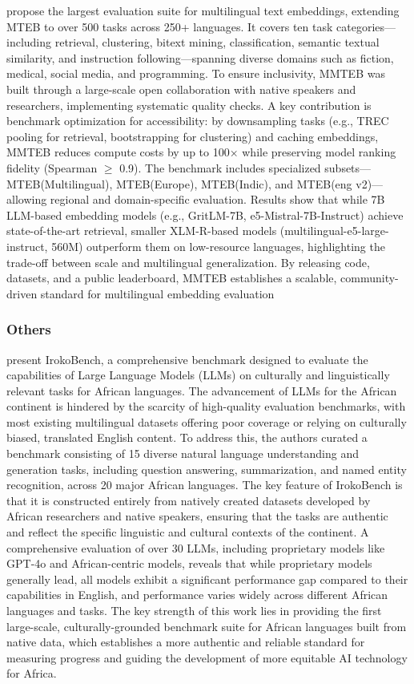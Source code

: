 \documentclass[acmsmall]{acmart}
\begin{document}
 \citep{enevoldsen2025mmtebmassivemultilingualtext} propose the largest evaluation suite for multilingual text embeddings, extending MTEB to over 500 tasks across 250+ languages. It covers ten task categories—including retrieval, clustering, bitext mining, classification, semantic textual similarity, and instruction following—spanning diverse domains such as fiction, medical, social media, and programming. To ensure inclusivity, MMTEB was built through a large-scale open collaboration with native speakers and researchers, implementing systematic quality checks. A key contribution is benchmark optimization for accessibility: by downsampling tasks (e.g., TREC pooling for retrieval, bootstrapping for clustering) and caching embeddings, MMTEB reduces compute costs by up to 100× while preserving model ranking fidelity (Spearman $\geq$ 0.9). The benchmark includes specialized subsets—MTEB(Multilingual), MTEB(Europe), MTEB(Indic), and MTEB(eng v2)—allowing regional and domain-specific evaluation. Results show that while 7B LLM-based embedding models (e.g., GritLM-7B, e5-Mistral-7B-Instruct) achieve state-of-the-art retrieval, smaller XLM-R-based models (multilingual-e5-large-instruct, 560M) outperform them on low-resource languages, highlighting the trade-off between scale and multilingual generalization. By releasing code, datasets, and a public leaderboard, MMTEB establishes a scalable, community-driven standard for multilingual embedding evaluation

\subsubsection{Others}
\noindent

\citep{adelani2024irokobench} present IrokoBench, a comprehensive benchmark designed to evaluate the capabilities of Large Language Models (LLMs) on culturally and linguistically relevant tasks for African languages. The advancement of LLMs for the African continent is hindered by the scarcity of high-quality evaluation benchmarks, with most existing multilingual datasets offering poor coverage or relying on culturally biased, translated English content. To address this, the authors curated a benchmark consisting of 15 diverse natural language understanding and generation tasks, including question answering, summarization, and named entity recognition, across 20 major African languages. The key feature of IrokoBench is that it is constructed entirely from natively created datasets developed by African researchers and native speakers, ensuring that the tasks are authentic and reflect the specific linguistic and cultural contexts of the continent. A comprehensive evaluation of over 30 LLMs, including proprietary models like GPT-4o and African-centric models, reveals that while proprietary models generally lead, all models exhibit a significant performance gap compared to their capabilities in English, and performance varies widely across different African languages and tasks. The key strength of this work lies in providing the first large-scale, culturally-grounded benchmark suite for African languages built from native data, which establishes a more authentic and reliable standard for measuring progress and guiding the development of more equitable AI technology for Africa.
\end{document}
